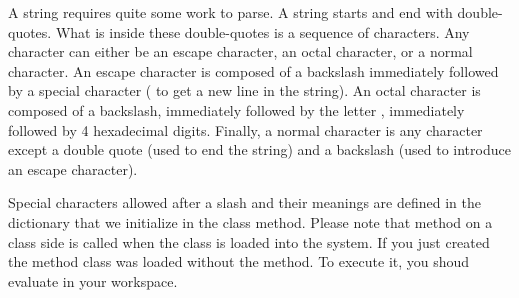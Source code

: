 \documentclass[a4paper,10pt,twoside]{book}
\begin{document}
A string requires quite some work to parse. A string starts and end
with double-quotes. What is inside these double-quotes is a sequence
of characters. Any character can either be an escape character, an
octal character, or a normal character. An escape character is
composed of a backslash immediately followed by a special character
(\eg{}  to get a new line in the string). An octal character
is composed of a backslash, immediately followed by the letter
, immediately followed by 4 hexadecimal digits. Finally, a
normal character is any character except a double quote (used to end
the string) and a backslash (used to introduce an escape character).



Special characters allowed after a slash and their meanings are
defined in the  dictionary that we initialize in
the  class method.
Please note that  method on a class side is called when the class is loaded into the system. 
If you just created the  method class was loaded without the method. 
To execute it, you shoud evaluate  in your workspace.

\end{document}
